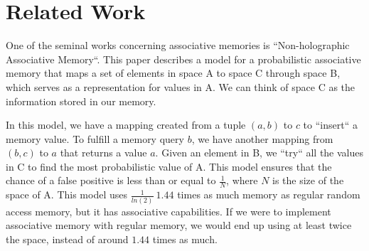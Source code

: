 \documentclass{sig-alternate}
\begin{document}
%


\section{Related Work}
\label{sec:related_work}
One of the seminal works concerning associative memories is ``Non-holographic
Associative Memory``. This paper describes a model for a probabilistic associative memory
that maps a set of elements in space A to space C through space B, which serves as a representation 
for values in A. We can think of space C as the information stored in our memory. 

In this model, we have a mapping created from a tuple $(a, b)$ to $c$ to ``insert`` a memory value. 
To fulfill a memory query $b$, we have another mapping from $(b, c)$ to $a$ that returns a value $a$.
Given an element in B, we ``try`` all the values in C to find the most probabilistic value of A. 
This model ensures that the chance of a false positive is less than or equal to $\frac{1}{N}$, where $N$
is the size of the space of A. This model uses $\frac{1}{ln(2)} ~ 1.44$ times as much memory as regular random access memory,
but it has associative capabilities. If we were to implement associative memory with regular memory, we would
end up using at least twice the space, instead of around $1.44$ times as much.
\end{document}
